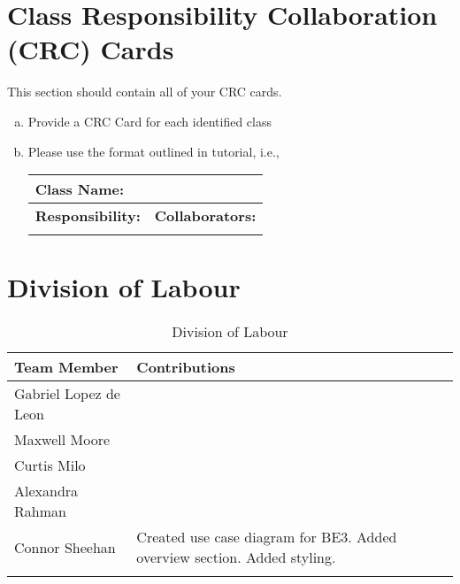 \documentclass[titlepage]{article}
\begin{document}
	
\section{Class Responsibility Collaboration (CRC) Cards}
\label{sec:class_responsibility_collaboration_crc_cards}
This section should contain all of your CRC cards.

\begin{enumerate}[a)]
	\item Provide a CRC Card for each identified class
	\item Please use the format outlined in tutorial, i.e., 
	\begin{table}[ht]
		\centering
		\begin{tabular}{|p{5cm}|p{5cm}|}
		\hline 
		 \multicolumn{2}{|l|}{\textbf{Class Name:}} \\
		\hline
		\textbf{Responsibility:} & \textbf{Collaborators:} \\
		\hline
		\vspace{1in} & \\
		\hline
		\end{tabular}
	\end{table}
	
\end{enumerate}
\newpage

\appendix
\section{Division of Labour}
\label{sec:division_of_labour}
\begin{longtable}{| p{} | p{} |}
			\hline
			\textbf {Team Member} & \textbf{Contributions}\\ 
			\hline
			Gabriel Lopez de Leon &  %
			\\
			\hline
			Maxwell Moore & %
			\\
			\hline
			Curtis Milo & %
			\\ 
			\hline
			Alexandra Rahman & %
			\\
			\hline
			Connor Sheehan & Created use case diagram for BE3. Added overview section. Added styling.\\
			\hline
			
			\caption{Division of Labour}
		\end{longtable}
\end{document}
